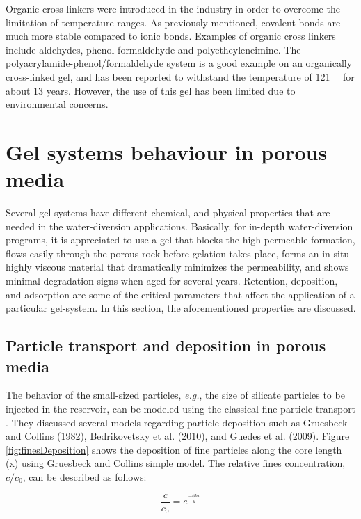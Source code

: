 Organic cross linkers were introduced in the industry in order to overcome the limitation of temperature ranges\citep{Al-Muntasheri2005}. As previously mentioned, covalent bonds are much more stable compared to ionic bonds. Examples of organic cross linkers include aldehydes, phenol-formaldehyde and polyetheyleneimine. The polyacrylamide-phenol/formaldehyde system is a good example on an organically cross-linked gel, and has been reported to withstand the temperature of 121~\celsius~ for about 13 years. However, the use of this gel has been limited due to environmental concerns.

\section{Gel systems behaviour in porous media}

Several gel-systems have different chemical, and physical properties that are needed in the water-diversion applications. Basically, for in-depth water-diversion programs, it is appreciated to use a gel that blocks the high-permeable formation, flows easily through the porous rock before gelation takes place, forms an in-situ highly viscous material that dramatically minimizes the permeability, and shows minimal degradation signs when aged for several years. Retention, deposition, and adsorption are some of the critical parameters that affect the application of a particular gel-system. In this section, the aforementioned properties are discussed.

\subsection{Particle transport and deposition in porous media}  The behavior of the small-sized particles, \textit{e.g.}, the size of silicate particles to be injected in the reservoir, can be modeled using the classical fine particle transport \citep{Stavland2011}. They discussed several models regarding particle deposition such as Gruesbeck and Collins (1982), Bedrikovetsky et al. (2010), and Guedes et al. (2009). Figure \ref{fig:finesDeposition} shows the deposition of fine particles along the core length (x) using Gruesbeck and Collins simple model. The relative fines concentration, $c/c_0$, can be described as follows:

\begin{equation}
    \frac{c}{c_0} = e^{\frac{-\phi bx}{u}}
\end{equation}

